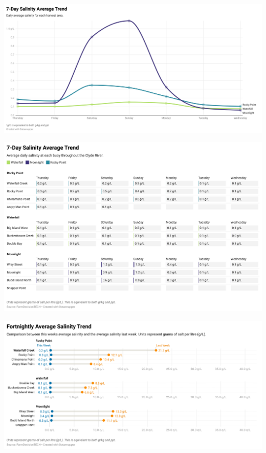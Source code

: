 \documentclass[10pt]{article}
\begin{document}
\begin{SidewaysFigure}
\centering
\includegraphics[width=1.3\textwidth]{weekly-salinity-chart.png}
\end{SidewaysFigure}
\vfill
\newpage

\begin{SidewaysFigure}
\centering
\includegraphics[width=1.3\textwidth]{weekly-salinity.png}
\end{SidewaysFigure}
\vfill
\newpage

\begin{SidewaysFigure}
\centering
\includegraphics[width=1.3\textwidth]{fortnightly-salinity.png}
\end{SidewaysFigure}
\vfill
\newpage
\end{document}
